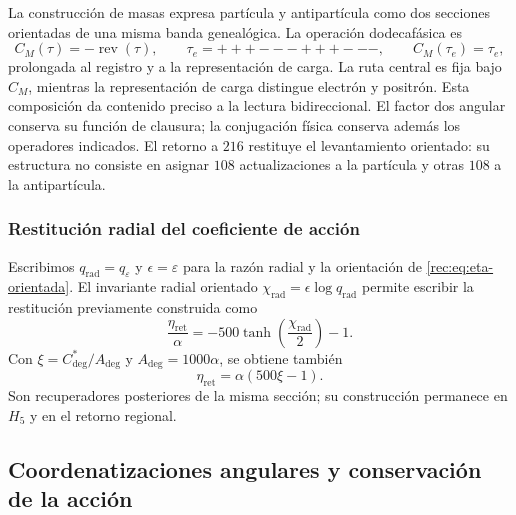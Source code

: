 La construcción de masas expresa partícula y antipartícula como dos
secciones orientadas de una misma banda genealógica. La operación
dodecafásica es
\begin{equation}
 C_M(\tau)=-\operatorname{rev}(\tau),
 \qquad \tau_e=+++---+++---,
 \qquad C_M(\tau_e)=\tau_e,
 \label{md:compos:conjugacion-dodecafasica}
\end{equation}
prolongada al registro y a la representación de carga. La ruta central es
fija bajo $C_M$, mientras la representación de carga distingue electrón y
positrón. Esta composición da contenido preciso a la lectura bidireccional.
El factor dos angular conserva su función de clausura; la conjugación física
conserva además los operadores indicados. El retorno a $216$ restituye el
levantamiento orientado: su estructura no consiste en asignar $108$
actualizaciones a la partícula y otras $108$ a la antipartícula.

\subsubsection{Restitución radial del coeficiente de acción}
\label{md:compos:quinientos}

Escribimos $q_{\mathrm{rad}}=q_\varepsilon$ y $\epsilon=\varepsilon$ para
la razón radial y la orientación de \eqref{rec:eq:eta-orientada}.
El invariante radial orientado $\chi_{\mathrm{rad}}=\epsilon\log q_{\mathrm{rad}}$
permite escribir la restitución previamente construida como
\begin{equation}
 \frac{\eta_{\mathrm{ret}}}{\alpha}
 =-500\tanh\!\left(\frac{\chi_{\mathrm{rad}}}{2}\right)-1.
 \label{md:compos:restitucion-radial}
\end{equation}
Con $\xi=C^*_{\deg}/A_{\deg}$ y $A_{\deg}=1000\alpha$, se obtiene también
\begin{equation}
 \eta_{\mathrm{ret}}=\alpha(500\xi-1).
 \label{md:compos:restitucion-xi}
\end{equation}
Son recuperadores posteriores de la misma sección; su construcción permanece
en $H_5$ y en el retorno regional.

\subsection{Coordenatizaciones angulares y conservación de la acción}
\label{md:compos:cartas}

